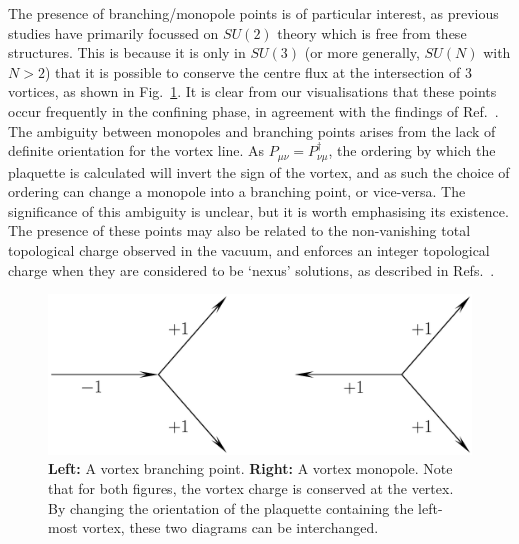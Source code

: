 The presence of branching/monopole points is of particular interest, as previous studies have primarily focussed on $SU(2)$ theory which is free from these structures. This is because it is only in $SU(3)$ (or more generally, $SU(N)$ with $N>2$) that it is possible to conserve the centre flux at the intersection of 3 vortices, as shown in Fig.~\ref{fig:VortexBranching}. It is clear from our visualisations that these points occur frequently in the confining phase, in agreement with the findings of Ref.~\cite{Spengler:2018dxt}. The ambiguity between monopoles and branching points arises from the lack of definite orientation for the vortex line. As $P_{\mu\nu} = P_{\nu\mu}^\dagger$, the ordering by which the plaquette is calculated will invert the sign of the vortex, and as such the choice of ordering can change a monopole into a branching point, or vice-versa. The significance of this ambiguity is unclear, but it is worth emphasising its existence. The presence of these points may also be related to the non-vanishing total topological charge observed in the vacuum, and enforces an integer topological charge when they are considered to be `nexus' solutions, as described in Refs.~\cite{Cornwall:1999xw,Cornwall:1998ef}.
%
\begin{figure}[htb!]
\centering
\includegraphics[width=\linewidth]{./VortexBranching.pdf}
\caption{\label{fig:VortexBranching}\textbf{Left:} A vortex branching point. \textbf{Right:} A vortex monopole. Note that for both figures, the vortex charge is conserved at the vertex. By changing the orientation of the plaquette containing the left-most vortex, these two diagrams can be interchanged.}
\end{figure}
%
